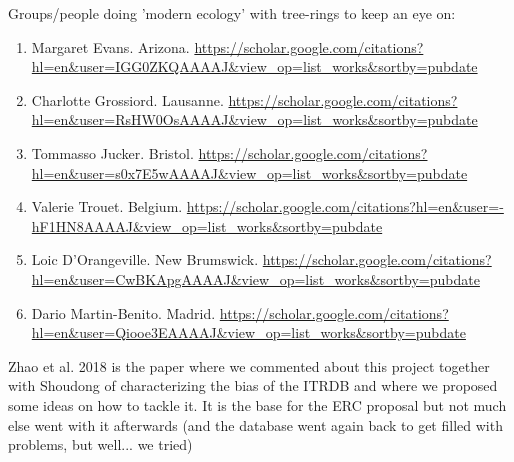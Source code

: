 \documentclass[11pt,letter]{article}
\begin{document}
Groups/people doing 'modern ecology' with tree-rings to keep an eye on:
\begin{enumerate}
\item Margaret Evans. Arizona. \url{https://scholar.google.com/citations?hl=en&user=IGG0ZKQAAAAJ&view_op=list_works&sortby=pubdate}
\item Charlotte Grossiord. Lausanne. \url{https://scholar.google.com/citations?hl=en&user=RsHW0OsAAAAJ&view_op=list_works&sortby=pubdate}
\item Tommasso Jucker. Bristol. \url{https://scholar.google.com/citations?hl=en&user=s0x7E5wAAAAJ&view_op=list_works&sortby=pubdate}
\item Valerie Trouet. Belgium. \url{https://scholar.google.com/citations?hl=en&user=-hF1HN8AAAAJ&view_op=list_works&sortby=pubdate}
\item Loic D'Orangeville. New Brumswick. \url{https://scholar.google.com/citations?hl=en&user=CwBKApgAAAAJ&view_op=list_works&sortby=pubdate}
\item Dario Martin-Benito. Madrid. \url{https://scholar.google.com/citations?hl=en&user=Qiooe3EAAAAJ&view_op=list_works&sortby=pubdate}
\end{enumerate}

Zhao et al. 2018 is the paper where we commented about this project together with Shoudong of characterizing the bias of the ITRDB and where we proposed some ideas on how to tackle it. It is the base for the ERC proposal but not much else went with it afterwards (and the database went again back to get filled with problems, but well... we tried)\\
\end{document}
